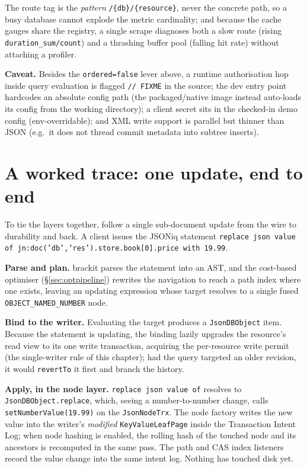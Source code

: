 \documentclass[11pt,a4paper,oneside]{report}
\theoremstyle{sirixthm}
\newcommand{\code}[1]{\texttt{#1}}
\begin{document}
\noindent The route tag is the \emph{pattern} \code{/\{db\}/\{resource\}}, never the concrete path, so a
busy database cannot explode the metric cardinality; and because the cache gauges share the registry, a
single scrape diagnoses both a slow route (rising \code{duration\_sum/count}) and a thrashing buffer pool
(falling hit rate) without attaching a profiler.

\begin{honesty}
\small\textbf{Caveat.} Besides the \code{ordered=false} lever above, a runtime authorisation
hop inside query evaluation is flagged \code{// FIXME} in the source; the dev entry point hardcodes
an absolute config path (the packaged/native image instead auto-loads its config from the working
directory); a client secret sits in the checked-in demo config (env-overridable); and XML write
support is parallel but thinner than JSON (e.g.\ it does not thread commit metadata into subtree
inserts).
\end{honesty}

\section{A worked trace: one update, end to end}
\label{sec:worked}

To tie the layers together, follow a single sub-document update from the wire to durability and back. A
client issues the JSONiq statement \code{replace json value of jn:doc('db','res').store.book[0].price
with 19.99}.

\textbf{Parse and plan.} brackit parses the statement into an AST, and the cost-based optimiser
(\S\ref{sec:optpipeline}) rewrites the navigation to reach a path index where one exists, leaving an
updating expression whose target resolves to a single fused \code{OBJECT\_NAMED\_NUMBER} node.

\textbf{Bind to the writer.} Evaluating the target produces a \code{JsonDBObject} item. Because the
statement is updating, the binding lazily upgrades the resource's read view to its one write transaction,
acquiring the per-resource write permit (the single-writer rule of this chapter); had the query targeted
an older revision, it would \code{revertTo} it first and branch the history.

\textbf{Apply, in the node layer.} \code{replace json value of} resolves to \code{JsonDBObject.replace},
which, seeing a number-to-number change, calls \code{setNumberValue(19.99)} on the \code{JsonNodeTrx}.
The node factory writes the new value into the writer's \emph{modified} \code{KeyValueLeafPage} inside
the Transaction Intent Log; when node hashing is enabled, the rolling hash of the touched node and
its ancestors is recomputed in the same pass. The path and CAS index listeners record the value
change into the same intent log.
Nothing has touched disk yet.
\end{document}
